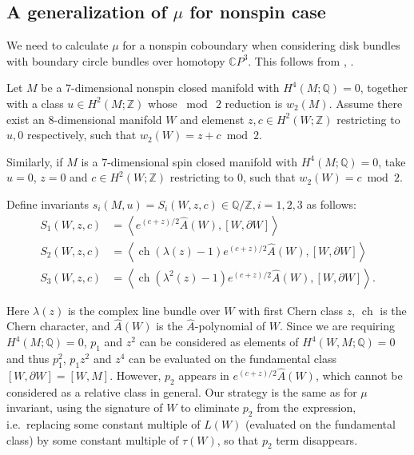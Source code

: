 \documentclass[twoside]{article}
\begin{document}
\subsection{A generalization of \texorpdfstring{$\mu$}{mu} for nonspin case}

We need to calculate $\mu$ for a nonspin coboundary when considering disk bundles with boundary circle bundles over homotopy $\mathbb{C}P^3$. This follows from \cite{kreckstolz2}, \cite{kreckstolz}. 


Let $M$ be a $7$-dimensional nonspin closed manifold with $H^4(M; \mathbb{Q})  =  0$, together with a class $u  \in   H^2(M; \mathbb{Z})$ whose $\bmod  \ 2$ reduction is $w_2(M)$. Assume there exist an $8$-dimensional manifold
$W$ and elemenst $z,c  \in   H^2(W; \mathbb{Z})$ restricting to $u,0$ respectively, such that $w_2(W) = z + c \bmod 2$. 

Similarly, if $M$ is a $7$-dimensional spin closed manifold with $H^4(M; \mathbb{Q})  =  0$, take $u = 0$, $z = 0$ and $c  \in   H^2(W; \mathbb{Z})$ restricting to $0$, such that $w_2(W) = c \bmod 2$. 

Define invariants $s_i(M, u) = S_i(W,z,c) \in   \mathbb{Q}/\mathbb{Z}, i = 1,2,3$ as follows: 
\[
\begin{aligned}
S_{1}(W, z, c)& = \left\langle e^{(c + z) / 2} \widehat{A}(W),[W, \partial W]\right\rangle \\
S_{2}(W, z, c)& = \left\langle\operatorname{ch}(\lambda(z)-1) e^{(c + z) / 2} \widehat{A}(W),[W, \partial W]\right\rangle \\
S_{3}(W, z, c)& = \left\langle\operatorname{ch}(\lambda^{2}(z)-1) e^{(c + z) / 2} \widehat{A}(W),[W, \partial W]\right\rangle.
\end{aligned}
\]

Here $\lambda(z)$ is the complex line bundle over $W$ with first Chern class $z$, $\operatorname{ch}$ is the Chern character, and $\widehat{A}(W)$ is the $\widehat{A}$-polynomial of $W$. Since we are requiring $H^4(M; \mathbb{Q})  =  0$, $p_1$ and $z^2$ can be considered as elements of $H^4(W,M; \mathbb{Q})  =  0$ and thus $p_1^2$, $p_1z^2$ and $z^4$ can be evaluated on the fundamental class $[W, \partial W] = [W, M]$. However, $p_2$ appears in $e^{(c + z) / 2} \widehat{A}(W)$, which cannot be considered as a relative class in general. Our strategy is the same as for $\mu$ invariant, using the signature of $W$ to eliminate $p_2$ from the expression, i.e.\ replacing some constant multiple of $L(W)$ (evaluated on the fundamental class) by some constant multiple of $\tau(W)$, so that $p_2$ term disappears. 
\end{document}
